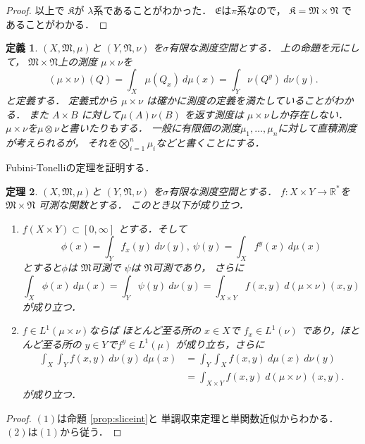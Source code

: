 \documentclass[leqno, a4paper, 12pt]{jsarticle}
\newtheorem{thm}{定理}
\newtheorem{df}[thm]{定義}
\newcommand{\rr}{\mathbb{R}}
\begin{document}
\begin{proof}
以上で
$\mathfrak{K}$が
$\lambda$系であることがわかった．
$\mathfrak{E}$は$\pi$系なので，
$\mathfrak{K}=\mathfrak{M}\times \mathfrak{N}$
であることがわかる．
\end{proof}

\begin{df}
$(X, \mathfrak{M}, \mu)$と
$(Y, \mathfrak{N}, \nu)$
を$\sigma$有限な測度空間とする．
上の命題を元にして，
$\mathfrak{M}\times \mathfrak{N}$上の測度
$\mu\times \nu$を
\[
(\mu\times \nu)(Q)=
\int_{X}\mu(Q_{x})\ d\mu(x)=
\int_{Y}\nu(Q^{y})\ d\nu(y). 
\]
と定義する．
定義式から
$\mu\times \nu$
は確かに測度の定義を満たしていることがわかる．
また
$A\times B$
に対して$\mu(A)\nu(B)$
を返す測度は
$\mu\times \nu$しか存在しない．
$\mu\times \nu$を$\mu\otimes \nu$と書いたりもする．
一般に有限個の測度$\mu_{1}, \dots, \mu_{n}$に対して直積測度が考えられるが，
それを$\bigotimes_{i=1}^{n}\mu_{i}$などと書くことにする．
\end{df}

Fubini-Tonelliの定理を証明する．
\begin{thm}\label{thm:ft}
$(X, \mathfrak{M}, \mu)$と
$(Y, \mathfrak{N}, \nu)$
を$\sigma$有限な測度空間とする．
$f: X\times Y\to \rr^{*}$を
$\mathfrak{M}\times \mathfrak{N}$
可測な関数とする．
このとき以下が成り立つ．
\begin{enumerate}
\item $f(X\times Y)\subset  [0, \infty]$
とする．そして
\[
\phi(x)=\int_{Y}f_{x}(y)\ d\nu(y), \ 
\psi(y)=\int_{X}f^{y}(x)\ d\mu(x)
\]
とすると$\phi$は
$\mathfrak{M}$可測で
$\psi$は
$\mathfrak{N}$可測であり，
さらに
\[
\int_{X}\phi(x)\ d\mu(x)=\int_{Y}\psi(y)\ d\nu(y)
=\int_{X\times Y} f(x, y)\ d(\mu\times \nu)(x, y)
\]
が成り立つ．
\item 
$f\in L^{1}(\mu\times \nu)$ならば
ほとんど至る所の
$x\in X$で
$f_{x}\in L^{1}(\nu)$
であり，ほとんど至る所の
$y\in Y$で$f^{y}\in L^{1}(\mu)$
が成り立ち，さらに
\begin{align*}
\int_{X}\int_{Y}f(x, y)\ d\nu(y)\ d\mu(x)
&=\int_{Y}\int_{X} f(x, y)\ d\mu(x)\ d\nu(y)\\
&=\int_{X\times Y} f(x, y)\ d(\mu\times \nu)(x, y).
\end{align*}
が成り立つ．

\end{enumerate}
\end{thm}
\begin{proof}
$(1)$は命題 \ref{prop:sliceint}と
単調収束定理と単関数近似からわかる．
$(2)$は$(1)$から従う．
\end{proof}
\end{document}

